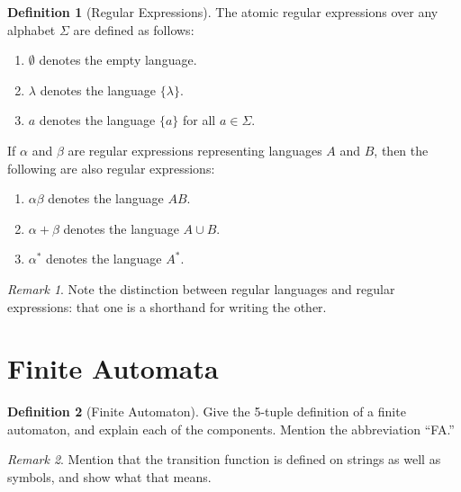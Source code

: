 \documentclass[12 pt, twoside, letterpaper]{article}
\newcommand{\meo}[1]{\texttt{#1}}
\renewcommand{\meo}[1]{\iffalse #1 \fi}
\theoremstyle{definition}
\newtheorem{definition}{Definition}
\theoremstyle{remark}
\newtheorem*{remark}{Remark}
\theoremstyle{plain}
\begin{document}
	\begin{definition}[Regular Expressions]
		The atomic regular expressions over any alphabet $\Sigma$ are defined as follows:
		\begin{enumerate}[label=(\roman*), itemsep = -0.3 ex]
			\item $\emptyset$ denotes the empty language.
			\item $\lambda$ denotes the language $\{ \lambda \}$.
			\item $a$ denotes the language $\{ a \}$ for all $a \in \Sigma$.
		\end{enumerate}

		If $\alpha$ and $\beta$ are regular expressions representing languages $A$ and $B$, then the following are also regular expressions:
		\begin{enumerate}[label=(\roman*), itemsep = -0.3 ex]
			\item $\alpha \beta$ denotes the language $AB$.
			\item $\alpha + \beta$ denotes the language $A \cup B$.
			\item $\alpha^*$ denotes the language $A^*$.
		\end{enumerate}
	\end{definition}

	\begin{remark}
		Note the distinction between regular languages and regular expressions: that one is a shorthand for writing the other.
	\end{remark}

	\meo{
		I could mention here that regular expressions are an example of a grammar, shockingly belonging to the class of regular grammars.
	}


\section{Finite Automata} %
\label{sec:finite_automata}

	\begin{definition}[Finite Automaton]
		Give the 5-tuple definition of a finite automaton, and explain each of the components.
		Mention the abbreviation ``FA.''
	\end{definition}

	\begin{remark}
		Mention that the transition function is defined on strings as well as symbols, and show what that means.
	\end{remark}
\end{document}
